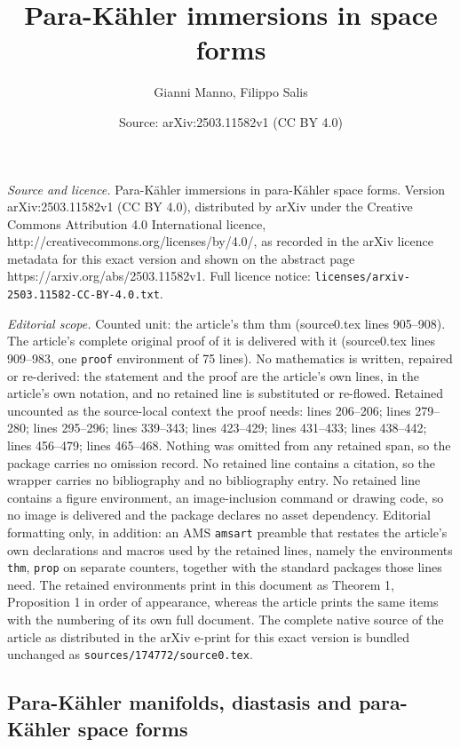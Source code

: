 \documentclass[10pt,a4paper]{amsart}
\title{Para-K\"ahler immersions in \pk space forms}
\author{Gianni Manno, Filippo Salis}
\date{Source: arXiv:2503.11582v1 (CC BY 4.0)}
\newcommand{\pk}{para-K\"ahler }
\begin{document}
\maketitle

\noindent\emph{Source and licence.} Para-K\"ahler immersions in \pk space forms. Version arXiv:2503.11582v1 (CC BY 4.0), distributed by arXiv under the Creative Commons Attribution 4.0 International licence, http://creativecommons.org/licenses/by/4.0/, as recorded in the arXiv licence metadata for this exact version and shown on the abstract page https://arxiv.org/abs/2503.11582v1. Full licence notice: \texttt{licenses/arxiv-2503.11582-CC-BY-4.0.txt}.\par\smallskip

\noindent\textit{Editorial scope.} Counted unit: the article's thm thm (source0.tex lines 905--908). The article's complete original proof of it is delivered with it (source0.tex lines 909--983, one \texttt{proof} environment of 75 lines). No mathematics is written, repaired or re-derived: the statement and the proof are the article's own lines, in the article's own notation, and no retained line is substituted or re-flowed.  Retained uncounted as the source-local context the proof needs: lines 206--206; lines 279--280; lines 295--296; lines 339--343; lines 423--429; lines 431--433; lines 438--442; lines 456--479; lines 465--468.  Nothing was omitted from any retained span, so the package carries no omission record.  No retained line contains a citation, so the wrapper carries no bibliography and no bibliography entry.  No retained line contains a figure environment, an image-inclusion command or drawing code, so no image is delivered and the package declares no asset dependency.  Editorial formatting only, in addition: an AMS \texttt{amsart} preamble that restates the article's own declarations and macros used by the retained lines, namely the environments \texttt{thm}, \texttt{prop} on separate counters, together with the standard packages those lines need.  The retained environments print in this document as Theorem 1, Proposition 1 in order of appearance, whereas the article prints the same items with the numbering of its own full document.  The complete native source of the article as distributed in the arXiv e-print for this exact version is bundled unchanged as \texttt{sources/174772/source0.tex}.
\subsection{Para-K\"ahler  manifolds, diastasis and \pk space forms}\label{sec.pk.diastasis}
\end{document}
